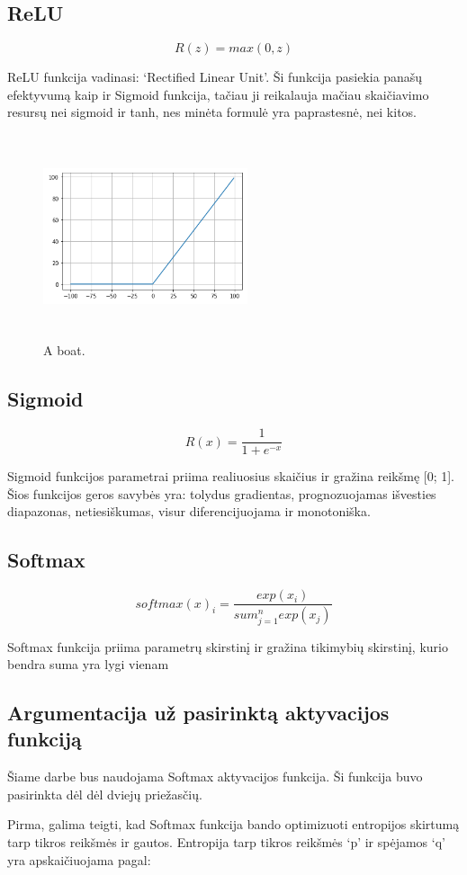 \documentclass{VUMIFInfKursinis}
\begin{document}
\subsection{ReLU}
\[
  R(z) = max(0, z)
\]

\par
ReLU funkcija vadinasi: ‘Rectified Linear Unit’. Ši funkcija pasiekia panašų efektyvumą
kaip ir Sigmoid funkcija, tačiau ji reikalauja mačiau skaičiavimo resursų nei sigmoid
ir tanh, nes minėta formulė yra paprastesnė, nei kitos.

\begin{figure}[ht]
  \includegraphics[width=6cm,height=6cm,keepaspectratio]{relu.png}
  \caption{A boat.}
  \label{fig:boat1}
\end{figure}

\subsection{Sigmoid}
\[
  R(x) = \frac{1}{1 + e^{-x}}
\]

\par
Sigmoid funkcijos parametrai priima realiuosius skaičius ir gražina reikšmę [0; 1].
Šios funkcijos geros savybės yra: tolydus gradientas, prognozuojamas išvesties
diapazonas, netiesiškumas, visur diferencijuojama ir monotoniška.

\subsection{Softmax}
\[
  softmax(x)_i = \frac{exp(x_i)}{sum_{j=1}^{n}exp(x_j)}
\]

\par
Softmax funkcija priima parametrų skirstinį ir gražina tikimybių skirstinį,
kurio bendra suma yra lygi vienam

\subsection{Argumentacija už pasirinktą aktyvacijos funkciją}
\par
Šiame darbe bus naudojama Softmax aktyvacijos funkcija. Ši funkcija buvo
pasirinkta dėl dėl dviejų priežasčių.
\par
Pirma, galima teigti, kad Softmax funkcija bando optimizuoti entropijos
skirtumą tarp tikros reikšmės ir gautos. Entropija tarp tikros reikšmės
‘p’ ir spėjamos ‘q’ yra apskaičiuojama pagal:
\end{document}
